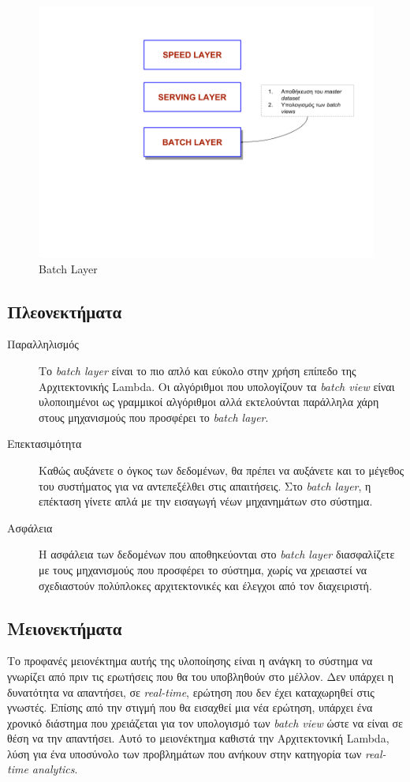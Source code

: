 \begin{figure}[t]
\caption{Batch Layer}
\includegraphics[width=14cm]{images/batch_layer.png}
\centering
\end{figure}
\clearpage

\subsection{Πλεονεκτήματα}
\begin{description}
\item[Παραλληλισμός] Το \textit{batch layer} είναι το πιο απλό και εύκολο στην χρήση επίπεδο της Αρχιτεκτονικής Lambda. Οι αλγόριθμοι που υπολογίζουν τα \textit{batch view} είναι υλοποιημένοι ως γραμμικοί αλγόριθμοι αλλά εκτελούνται παράλληλα χάρη στους μηχανισμούς που προσφέρει το \textit{batch layer}.
\item[Επεκτασιμότητα] Καθώς αυξάνετε ο όγκος των δεδομένων, θα πρέπει να αυξάνετε και το μέγεθος του συστήματος για να αντεπεξέλθει στις απαιτήσεις. Στο \textit{batch layer}, η επέκταση γίνετε απλά με την εισαγωγή νέων μηχανημάτων στο σύστημα.
\item[Ασφάλεια] Η ασφάλεια των δεδομένων που αποθηκεύονται στο \textit{batch layer} διασφαλίζετε με τους μηχανισμούς που προσφέρει το σύστημα, χωρίς να χρειαστεί να σχεδιαστούν πολύπλοκες αρχιτεκτονικές και έλεγχοι από τον διαχειριστή.
\end{description}


\subsection{Μειονεκτήματα}
Το προφανές μειονέκτημα αυτής της υλοποίησης είναι η ανάγκη το σύστημα να γνωρίζει από πριν τις ερωτήσεις που θα του υποβληθούν στο μέλλον. Δεν υπάρχει η δυνατότητα να απαντήσει, σε \textit{real-time}, ερώτηση που δεν έχει καταχωρηθεί στις γνωστές. Επίσης από την στιγμή που θα εισαχθεί μια νέα ερώτηση, υπάρχει ένα χρονικό διάστημα που χρειάζεται για τον υπολογισμό των \textit{batch view} ώστε να είναι σε θέση να την απαντήσει. Αυτό το μειονέκτημα καθιστά την Αρχιτεκτονική Lambda, λύση για ένα υποσύνολο των προβλημάτων που ανήκουν στην κατηγορία των \textit{real-time analytics}.

